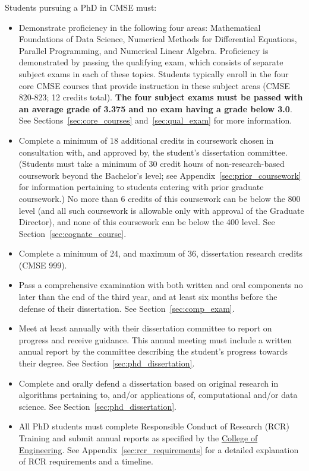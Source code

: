 Students pursuing a PhD in CMSE must:

\begin{itemize}
\item  Demonstrate proficiency in the following four areas:
  Mathematical Foundations of Data Science, Numerical Methods for
  Differential Equations, Parallel Programming, and Numerical Linear
  Algebra.  Proficiency is demonstrated by passing the qualifying
  exam, which consists of separate subject exams in each of these
  topics.  Students typically enroll in the four core CMSE courses
  that provide instruction in these subject areas (CMSE 820-823; 12
  credits total).  \textbf{The four subject exams must be passed with an
  average grade of 3.375 and no exam having a grade below 3.0}.  See
Sections~\ref{sec:core_courses} and~\ref{sec:qual_exam} for more information.

\item Complete a minimum of 18 additional credits in coursework
  chosen in consultation with, and approved by, the student's
  dissertation committee.  (Students must take a minimum of 30 credit
  hours of non-research-based coursework beyond the Bachelor's level;
  see Appendix~\ref{sec:prior_coursework} for information pertaining
  to students entering with prior graduate coursework.)
  No more than 6 credits of this coursework can be below the 800 level
  (and all such coursework is allowable only with approval of the
  Graduate Director), and none of this coursework can be below the 400
  level.  See Section~\ref{sec:cognate_course}.  

\item Complete a minimum of 24, and maximum of 36, dissertation
  research credits (CMSE 999).

\item Pass a comprehensive examination with both written and oral
  components no later than the end of the third year, and at least six months before the defense of their
  dissertation.  See Section~\ref{sec:comp_exam}.

\item Meet at least annually with their dissertation committee to report on
  progress and receive guidance.  This annual meeting must include a
  written annual report by the committee describing the student's
  progress towards their degree.   See Section~\ref{sec:phd_dissertation}.

\item Complete and orally defend a dissertation based on original
  research in algorithms pertaining to, and/or applications of,
  computational and/or data science.  See Section~\ref{sec:phd_dissertation}.

\item All PhD students must complete Responsible Conduct of Research (RCR)
  Training and submit annual reports as specified by the
  \href{https://www.egr.msu.edu/academics/graduate/rcr}{College of
    Engineering}.  See Appendix~\ref{sec:rcr_requirements} for a
  detailed explanation of RCR requirements and a timeline.

\end{itemize}


